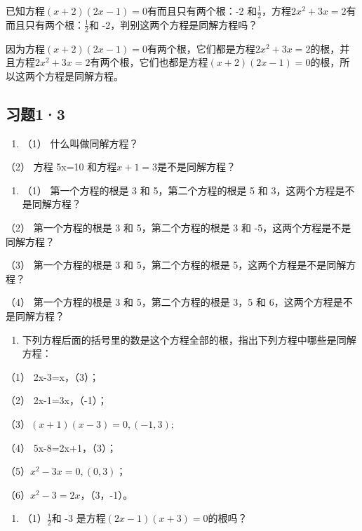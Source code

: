 已知方程\((x + 2)(2x - 1) = 0\)有而且只有两个根：-2
和\(\frac{1}{2}\)，方程\(2x^{2} + 3x = 2\)有而且只有两个根：\(\frac{1}{2}\)和
-2，判别这两个方程是同解方程吗？

因为方程\((x + 2)(2x - 1) = 0\)有两个根，它们都是方程\(2x^{2} + 3x = 2\)的根，并且方程\(2x^{2} + 3x = 2\)有两个根，它们也都是方程\((x + 2)(2x - 1) = 0\)的根，所以这两个方程是同解方程。

\subsection{习题1·3}

\begin{enumerate}
\item
  （1） 什么叫做同解方程？
\end{enumerate}

（2） 方程 5x=10 和方程\(x+1=3\)是不是同解方程？

\begin{enumerate}[start=2]
\item
  （1） 第一个方程的根是 3 和 5，第二个方程的根是 5 和
  3，这两个方程是不是同解方程？
\end{enumerate}

（2） 第一个方程的根是 3 和 5，第二个方程的根是 3 和
-5，这两个方程是不是同解方程？

（3） 第一个方程的根是 3 和 5，第二个方程的根是
5，这两个方程是不是同解方程？

（4） 第一个方程的根是 3 和 5，第二个方程的根是 3，5 和
6，这两个方程是不是同解方程？

\begin{enumerate}[start=3]
\item
  下列方程后面的括号里的数是这个方程全部的根，指出下列方程中哪些是同解方程：
\end{enumerate}

（1） 2x-3=x，（3）；

（2） 2x-1=3x，（-1）；

（3）\((x+1)(x-3)=0,(-1,3);\)

（4） 5x-8=2x+1，（3）；

（5）\(x^{2} - 3x = 0, (0, 3)\)；

（6）\(x^{2} - 3 = 2x\)，（3，-1）。

\begin{enumerate}[start=4]
\item
  （1）\(\frac{1}{2}\)和 -3 是方程\((2x - 1)(x + 3) = 0\)的根吗？
\end{enumerate}

